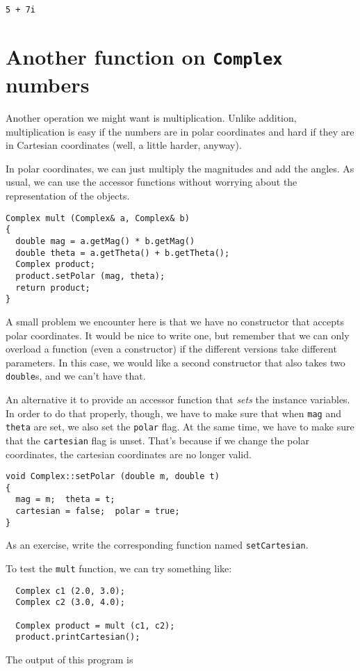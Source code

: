 \begin{verbatim}
5 + 7i
\end{verbatim}
%


\section{Another function on {\tt Complex} numbers}

Another operation we might want is multiplication.  Unlike
addition, multiplication is easy if the numbers are in polar
coordinates and hard if they are in Cartesian coordinates
(well, a little harder, anyway).

In polar coordinates, we can just multiply the magnitudes and
add the angles.  As usual, we can use the accessor functions
without worrying about the representation of the objects.

\begin{verbatim}
Complex mult (Complex& a, Complex& b)
{
  double mag = a.getMag() * b.getMag()
  double theta = a.getTheta() + b.getTheta();
  Complex product;
  product.setPolar (mag, theta);
  return product;
}
\end{verbatim}
%
A small problem we encounter here is that we have no constructor
that accepts polar coordinates.  It would be nice to write one,
but remember that we can only overload a function (even a
constructor) if the different versions take different parameters.
In this case, we would like a second constructor that also takes
two {\tt double}s, and we can't have that.

An alternative it to provide an accessor function that {\em sets}
the instance variables.  In order to do that properly, though,
we have to make sure that when {\tt mag} and {\tt theta} are set,
we also set the {\tt polar} flag.  At the same time, we have to
make sure that the {\tt cartesian} flag is unset.  That's because
if we change the polar coordinates, the cartesian coordinates are
no longer valid.

\begin{verbatim}
void Complex::setPolar (double m, double t)
{
  mag = m;  theta = t;
  cartesian = false;  polar = true;
}
\end{verbatim}
%
As an exercise, write the corresponding function named
{\tt setCartesian}.

To test the {\tt mult} function, we can try something like:

\begin{verbatim}
  Complex c1 (2.0, 3.0);
  Complex c2 (3.0, 4.0);

  Complex product = mult (c1, c2);
  product.printCartesian();
\end{verbatim}
%
The output of this program is

